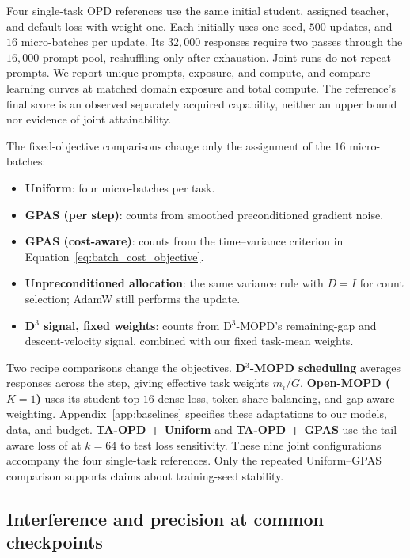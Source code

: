 Four single-task OPD references use the same initial student, assigned teacher,
and default loss with weight one. Each initially uses one seed, $500$ updates,
and $16$ micro-batches per update. Its $32{,}000$ responses require two passes
through the $16{,}000$-prompt pool, reshuffling only after exhaustion. Joint
runs do not repeat prompts. We report unique prompts, exposure, and compute,
and compare learning curves at matched domain exposure and total compute.
The reference's final score is an observed separately acquired capability,
neither an upper bound nor evidence of joint attainability.

The fixed-objective comparisons change only the assignment of the $16$
micro-batches:
\begin{itemize}
    \item \textbf{Uniform}: four micro-batches per task.
    \item \textbf{GPAS (per step)}: counts from smoothed preconditioned
    gradient noise.
    \item \textbf{GPAS (cost-aware)}: counts from the time--variance
    criterion in Equation~\ref{eq:batch_cost_objective}.
    \item \textbf{Unpreconditioned allocation}: the same variance rule
    with $D=I$ for count selection; AdamW still performs the update.
    \item \textbf{D$^3$ signal, fixed weights}: counts from D$^3$-MOPD's
    remaining-gap and descent-velocity signal, combined with our fixed
    task-mean weights.
\end{itemize}

Two recipe comparisons change the objectives. \textbf{D$^3$-MOPD scheduling}
averages responses across the step, giving effective task weights $m_i/G$.
\textbf{Open-MOPD ($K=1$)} uses its student top-$16$ dense loss, token-share
balancing, and gap-aware weighting. Appendix~\ref{app:baselines} specifies
these adaptations to our models, data, and budget.
\textbf{TA-OPD + Uniform} and \textbf{TA-OPD + GPAS} use the tail-aware loss
of \citet{huang2026tailaware} at $k=64$ to test loss sensitivity. These nine
joint configurations accompany the four single-task references. Only the
repeated Uniform--GPAS comparison supports claims about training-seed stability.

\subsection{Interference and precision at common checkpoints}

